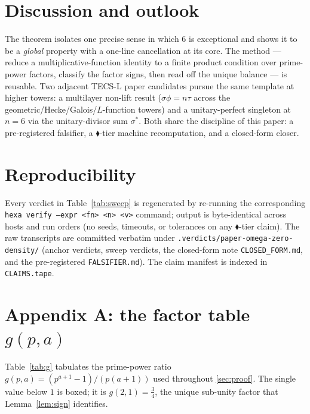 \documentclass[11pt,a4paper]{article}
\newcommand{\sig}{\sigma}
\newcommand{\formal}{\textcolor{blue!60!black}{$\blacklozenge$}}
\theoremstyle{plain}
\theoremstyle{definition}
\begin{document}
\section{Discussion and outlook}
\label{sec:discussion}

The theorem isolates one precise sense in which $6$ is exceptional and shows it
to be a \emph{global} property with a one-line cancellation at its core. The
method --- reduce a multiplicative-function identity to a finite product
condition over prime-power factors, classify the factor signs, then read off
the unique balance --- is reusable. Two adjacent TECS-L paper candidates pursue
the same template at higher towers: a multilayer non-lift result
($\sig\phi=n\tau$ across the geometric/Hecke/Galois/$L$-function towers) and a
unitary-perfect singleton at $n=6$ via the unitary-divisor sum $\sig^{*}$. Both
share the discipline of this paper: a pre-registered falsifier, a
\formal-tier machine recomputation, and a closed-form closer.

\section*{Reproducibility}

Every verdict in Table~\ref{tab:sweep} is regenerated by re-running the
corresponding \texttt{hexa verify --expr <fn> <n> <v>} command; output is
byte-identical across hosts and run orders (no seeds, timeouts, or tolerances
on any \formal-tier claim). The raw transcripts are committed verbatim under
\texttt{.verdicts/paper-omega-zero-density/} (anchor verdicts, sweep verdicts,
the closed-form note \texttt{CLOSED\_FORM.md}, and the pre-registered
\texttt{FALSIFIER.md}). The claim manifest is indexed in \texttt{CLAIMS.tape}.

\appendix

\section{Appendix A: the factor table $g(p,a)$}
\label{sec:gtable}

Table~\ref{tab:g} tabulates the prime-power ratio $g(p,a)=(p^{a+1}-1)/(p(a+1))$
used throughout \textsection\ref{sec:proof}. The single value below $1$ is
boxed; it is $g(2,1)=\tfrac34$, the unique sub-unity factor that
Lemma~\ref{lem:sign} identifies.
\end{document}
